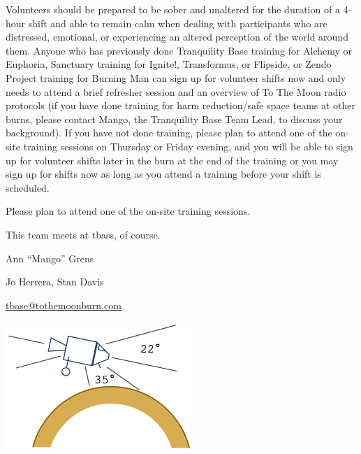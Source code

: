 \begin{multicols}{2}
Volunteers should be prepared to be sober and unaltered for the duration of a 4-hour shift and able to remain calm when dealing with participants who are distressed, emotional, or experiencing an altered perception of the world around them. Anyone who has previously done Tranquility Base training for Alchemy or Euphoria, Sanctuary training for Ignite!, Transformus, or Flipside, or Zendo Project training for Burning Man can sign up for volunteer shifts now and only needs to attend a brief refresher session and an overview of To The Moon radio protocols (if you have done training for harm reduction/safe space teams at other burns, please contact Mango, the Tranquility Base Team Lead, to discuss your background). If you have not done training, please plan to attend one of the on-site training sessions on Thursday or Friday evening, and you will be able to sign up for volunteer shifts later in the burn at the end of the training or you may sign up for shifts now as long as you attend a training before your shift is scheduled.

Please plan to attend one of the on-site training sessions.

This team meets at \gls{tbass}, of course.

\begin{description}[leftmargin=6em,noitemsep,style=nextline]
   \item[Lead:] Ann ``Mango'' Grens
   \item[Co-leads:] Jo Herrera, Stan Davis
   \item[Contact:] \url{tbase@tothemoonburn.com}
\end{description}

\begin{center}
	\includegraphics[width=\columnwidth]{images/landing3}
\end{center}


\end{multicols}
